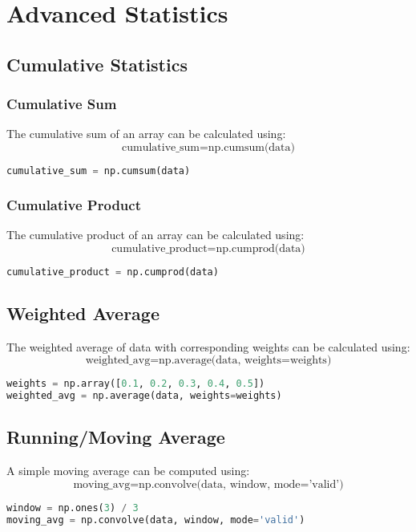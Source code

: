 \documentclass[a4paper, 12pt]{article}
\begin{document}
\section{Advanced Statistics}

\subsection{ Cumulative Statistics}
\subsubsection{ Cumulative Sum}
The cumulative sum of an array can be calculated using:
\[
\text{cumulative\_sum} = \text{np.cumsum(data)}
\]
\begin{lstlisting}[language=Python]
cumulative_sum = np.cumsum(data)
\end{lstlisting}

\subsubsection{ Cumulative Product}
The cumulative product of an array can be calculated using:
\[
\text{cumulative\_product} = \text{np.cumprod(data)}
\]
\begin{lstlisting}[language=Python]
cumulative_product = np.cumprod(data)
\end{lstlisting}

\subsection{Weighted Average}
The weighted average of data with corresponding weights can be calculated using:
\[
\text{weighted\_avg} = \text{np.average(data, weights=weights)}
\]
\begin{lstlisting}[language=Python]
weights = np.array([0.1, 0.2, 0.3, 0.4, 0.5])
weighted_avg = np.average(data, weights=weights)
\end{lstlisting}

\subsection{ Running/Moving Average}
A simple moving average can be computed using:
\[
\text{moving\_avg} = \text{np.convolve(data, window, mode='valid')}
\]
\begin{lstlisting}[language=Python]
window = np.ones(3) / 3
moving_avg = np.convolve(data, window, mode='valid')
\end{lstlisting}
\end{document}
